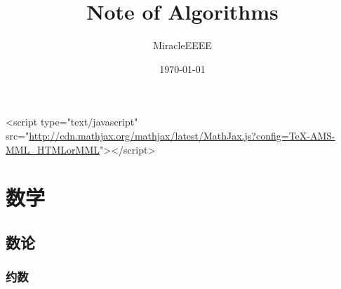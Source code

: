 \documentclass[11pt]{article}
\author{MiracleEEEE}
\date{\today}
\title{Note of Algorithms}
\begin{document}
\maketitle
\tableofcontents

<script type="text/javascript" src="\url{http://cdn.mathjax.org/mathjax/latest/MathJax.js?config=TeX-AMS-MML\_HTMLorMML}"></script>

\section{数学}
\label{sec:orga5acd6c}
\subsection{数论}
\label{sec:org33fef41}
\subsubsection{约数}
\label{sec:orgaf1d74f}
\end{document}
